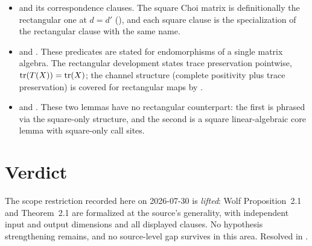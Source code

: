 \documentclass{article}
\begin{document}
\begin{itemize}
    \item {} and its correspondence
        clauses.  The square Choi matrix is definitionally the rectangular
        one at $d=d'$ (),
        and each square clause is the specialization of the rectangular
        clause with the same name.
    \item {} and .  These
        predicates are stated for endomorphisms of a single matrix algebra.
        The rectangular development states trace preservation pointwise,
        $\operatorname{tr}(T(X))=\operatorname{tr}(X)$; the channel structure (complete positivity
        plus trace preservation) is covered for rectangular maps by
        .
    \item {} and
        .  These two
        lemmas have no rectangular counterpart: the first is phrased via
        the square-only  structure, and the second is a
        square linear-algebraic core lemma with square-only call sites.
\end{itemize}

\section{Verdict}

The scope restriction recorded here on 2026-07-30 is \emph{lifted}: Wolf
Proposition~2.1 and Theorem~2.1 are formalized at the source's generality,
with independent input and output dimensions and all displayed clauses.
No hypothesis strengthening remains, and no source-level gap survives in
this area.  Resolved in .



\end{document}
